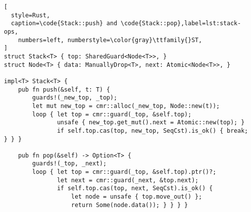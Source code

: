 \begin{lstlisting}[
  style=Rust,
  caption=\code{Stack::push} and \code{Stack::pop},label=lst:stack-ops,
    numbers=left, numberstyle=\color{gray}\ttfamily{}ST,
]
struct Stack<T> { top: SharedGuard<Node<T>>, }
struct Node<T> { data: ManuallyDrop<T>, next: Atomic<Node<T>>, }

impl<T> Stack<T> {
    pub fn push(&self, t: T) {
        guards!(_new_top, _top);
        let mut new_top = cmr::alloc(_new_top, Node::new(t));
        loop { let top = cmr::guard(_top, &self.top);
               unsafe { new_top.get_mut().next = Atomic::new(top); }
               if self.top.cas(top, new_top, SeqCst).is_ok() { break; } } }

    pub fn pop(&self) -> Option<T> {
        guards!(_top, _next);
        loop { let top = cmr::guard(_top, &self.top).ptr()?;
               let next = cmr::guard(_next, &top.next);
               if self.top.cas(top, next, SeqCst).is_ok() {
                   let node = unsafe { top.move_out() };
                   return Some(node.data()); } } } }
\end{lstlisting}
